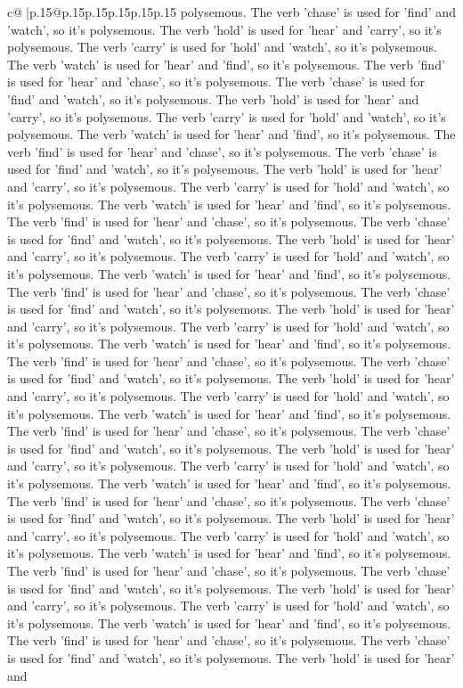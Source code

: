 \documentclass{article}
\begin{document}
{\begin{supertabular}{c@{$\;$}|p{.15\linewidth}@{}p{.15\linewidth}p{.15\linewidth}p{.15\linewidth}p{.15\linewidth}p{.15\linewidth}}
{{{polysemous. The verb 'chase' is used for 'find' and 'watch', so it's polysemous. The verb 'hold' is used for 'hear' and 'carry', so it's polysemous. The verb 'carry' is used for 'hold' and 'watch', so it's polysemous. The verb 'watch' is used for 'hear' and 'find', so it's polysemous. The verb 'find' is used for 'hear' and 'chase', so it's polysemous. The verb 'chase' is used for 'find' and 'watch', so it's polysemous. The verb 'hold' is used for 'hear' and 'carry', so it's polysemous. The verb 'carry' is used for 'hold' and 'watch', so it's polysemous. The verb 'watch' is used for 'hear' and 'find', so it's polysemous. The verb 'find' is used for 'hear' and 'chase', so it's polysemous. The verb 'chase' is used for 'find' and 'watch', so it's polysemous. The verb 'hold' is used for 'hear' and 'carry', so it's polysemous. The verb 'carry' is used for 'hold' and 'watch', so it's polysemous. The verb 'watch' is used for 'hear' and 'find', so it's polysemous. The verb 'find' is used for 'hear' and 'chase', so it's polysemous. The verb 'chase' is used for 'find' and 'watch', so it's polysemous. The verb 'hold' is used for 'hear' and 'carry', so it's polysemous. The verb 'carry' is used for 'hold' and 'watch', so it's polysemous. The verb 'watch' is used for 'hear' and 'find', so it's polysemous. The verb 'find' is used for 'hear' and 'chase', so it's polysemous. The verb 'chase' is used for 'find' and 'watch', so it's polysemous. The verb 'hold' is used for 'hear' and 'carry', so it's polysemous. The verb 'carry' is used for 'hold' and 'watch', so it's polysemous. The verb 'watch' is used for 'hear' and 'find', so it's polysemous. The verb 'find' is used for 'hear' and 'chase', so it's polysemous. The verb 'chase' is used for 'find' and 'watch', so it's polysemous. The verb 'hold' is used for 'hear' and 'carry', so it's polysemous. The verb 'carry' is used for 'hold' and 'watch', so it's polysemous. The verb 'watch' is used for 'hear' and 'find', so it's polysemous. The verb 'find' is used for 'hear' and 'chase', so it's polysemous. The verb 'chase' is used for 'find' and 'watch', so it's polysemous. The verb 'hold' is used for 'hear' and 'carry', so it's polysemous. The verb 'carry' is used for 'hold' and 'watch', so it's polysemous. The verb 'watch' is used for 'hear' and 'find', so it's polysemous. The verb 'find' is used for 'hear' and 'chase', so it's polysemous. The verb 'chase' is used for 'find' and 'watch', so it's polysemous. The verb 'hold' is used for 'hear' and 'carry', so it's polysemous. The verb 'carry' is used for 'hold' and 'watch', so it's polysemous. The verb 'watch' is used for 'hear' and 'find', so it's polysemous. The verb 'find' is used for 'hear' and 'chase', so it's polysemous. The verb 'chase' is used for 'find' and 'watch', so it's polysemous. The verb 'hold' is used for 'hear' and 'carry', so it's polysemous. The verb 'carry' is used for 'hold' and 'watch', so it's polysemous. The verb 'watch' is used for 'hear' and 'find', so it's polysemous. The verb 'find' is used for 'hear' and 'chase', so it's polysemous. The verb 'chase' is used for 'find' and 'watch', so it's polysemous. The verb 'hold' is used for 'hear' and }}}
\end{supertabular}}
\end{document}
